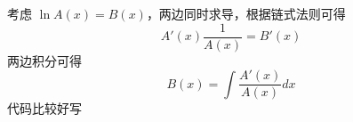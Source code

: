 考虑 $\ln A(x) = B(x)$，两边同时求导，根据链式法则可得
\[
A'(x)\frac{1}{A(x)} = B'(x)
\]
两边积分可得
\[
B(x) = \int \frac{A'(x)}{A(x)}dx
\]
代码比较好写